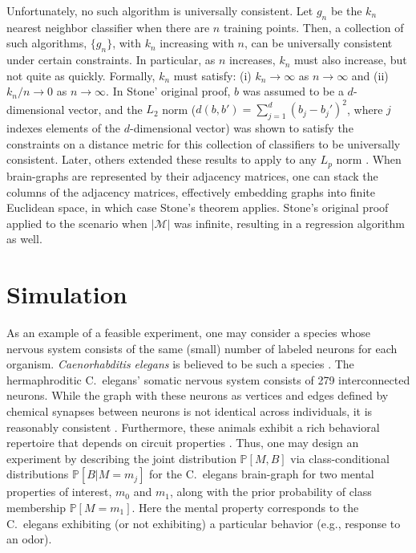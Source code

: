 \documentclass{article}
\newcommand{\conv}{\rightarrow}
\newcommand{\PP}{\mathbb{P}}           %
\providecommand{\mc}[1]{\mathcal{#1}}
\begin{document}
Unfortunately, no such algorithm is universally consistent.  Let $g_n$ be the $k_n$ nearest neighbor classifier when there are $n$ training points.  Then, a collection of such algorithms, $\{g_n\}$,  with $k_n$ increasing with $n$, can be universally consistent under certain constraints. In particular, as $n$ increases, $k_n$ must also increase, but not quite as quickly.  Formally, $k_n$ must satisfy: (i) $k_n \conv \infty$ as $n \conv \infty$ and (ii) $k_n/n \conv 0$ as $n\conv\infty$. In Stone' original proof, $b$ was assumed to be a $d$-dimensional vector, and the $L_2$ norm ($d(b,b')=\sum_{j=1}^d (b_j-b_j')^2$, where $j$ indexes elements of the $d$-dimensional vector) was shown to satisfy the constraints on a distance metric for this collection of classifiers to be universally consistent.  Later, others extended these results to apply to any $L_p$ norm \cite{DGL96}.  When brain-graphs are represented by their adjacency matrices, one can stack the columns of the adjacency matrices, effectively embedding graphs into finite Euclidean space, in which case Stone's theorem applies.  Stone's original proof applied to the scenario when $|\mc{M}|$ was infinite, resulting in a regression algorithm as well.


\section{Simulation} %
\label{sec:sim}

As an example of a feasible experiment, one may consider a species whose nervous system consists of the same (small) number of labeled neurons for each organism. {\it Caenorhabditis elegans} is believed to be such a species \cite{Durbin87}. The hermaphroditic C.~elegans' somatic nervous system consists of 279 interconnected neurons. While the graph with these neurons as vertices and edges defined by chemical synapses between neurons is not identical across individuals, it is reasonably consistent \cite{Durbin87}. Furthermore, these animals exhibit a rich behavioral repertoire that depends on circuit properties \cite{deBonoMaricq05}. Thus, one may design an experiment by describing the joint distribution $\PP[M,B]$ via class-conditional distributions $\PP[B|M=m_j]$ for the C.~elegans brain-graph for two mental properties of interest, $m_0$ and $m_1$, along with the prior probability of class membership $\PP[M=m_1]$. Here the mental property corresponds to the C.~elegans exhibiting (or not exhibiting) a particular behavior (e.g., response to an odor).
\end{document}
